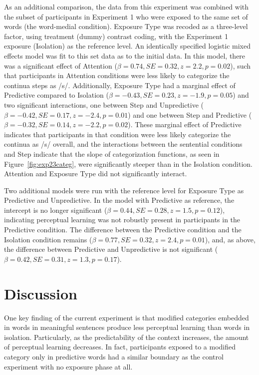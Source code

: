 As an additional comparison, the data from this experiment was combined with the subset of participants in Experiment 1 who were exposed to the same set of words (the word-medial condition).  
Exposure Type was recoded as a three-level factor, using treatment (dummy) contrast coding, with the Experiment 1 exposure (Isolation) as the reference level. 
An identically specified logistic mixed effects model was fit to this set data as to the initial data.  
In this model, there was a significant effect of Attention ($\beta = 0.74, SE = 0.32, z = 2.2, p = 0.02$), such that participants in Attention conditions were less likely to categorize the continua steps as /s/.  
Additionally, Exposure Type had a marginal effect of Predictive compared to Isolation ($\beta = -0.43, SE = 0.23, z = -1.9, p = 0.05$) and two significant interactions, one between Step and Unpredictive ($\beta = -0.42, SE = 0.17, z = -2.4, p = 0.01$) and one between Step and Predictive ($\beta = -0.32, SE = 0.14, z = -2.2, p = 0.02$).  
These marginal effect of Predictive indicates that participants in that condition were less likely categorize the continua as /s/ overall, and the interactions between the sentential conditions and Step indicate that the slope of categorization functions, as seen in Figure~\ref{fig:exp23categ}, were significantly steeper than in the Isolation condition.
Attention and Exposure Type did not significantly interact.

Two additional models were run with the reference level for Exposure Type as Predictive and Unpredictive.  In the model with Predictive as reference, the intercept is no longer significant ($\beta = 0.44, SE = 0.28, z = 1.5, p = 0.12$), indicating perceptual learning was not robustly present in participants in the Predictive condition.  The difference between the Predictive condition and the Isolation condition remains ($\beta = 0.77, SE = 0.32, z = 2.4, p = 0.01$), and, as above, the difference between Predictive and Unpredictive is not significant ($\beta = 0.42, SE = 0.31, z = 1.3, p = 0.17$). %


\section{Discussion}

One key finding of the current experiment is that modified categories embedded in words in meaningful sentences produce less perceptual learning than words in isolation.  
Particularly, as the predictability of the context increases, the amount of perceptual learning decreases.  
In fact, participants exposed to a modified category only in predictive words had a similar boundary as the control experiment with no exposure phase at all. 


